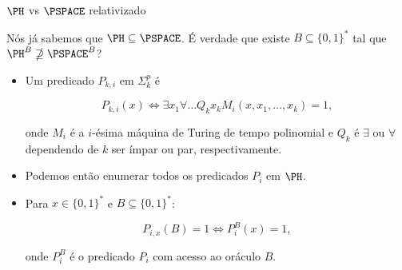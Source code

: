 \documentclass[landscape, 9pt]{beamer}
\newcommand{\binalph}{\{0, 1\}}
\begin{document}
\begin{frame} {$\PH$ vs $\PSPACE$ relativizado}

Nós já sabemos que $\PH \subseteq \PSPACE$. É verdade que existe $B \subseteq \binalph^{*}$ tal que $\PH^{B} \nsupseteq \PSPACE^{B}$?

\begin{itemize}

	\item Um predicado $P_{k, i}$ em $\Sigma_{k}^{p}$ é
	
	\begin{equation*}
		P_{k, i}(x) \iff \exists x_{1} \forall \dots Q_{k} x_{k} M_{i}(x, x_{1}, \dots, x_{k}) = 1,
	\end{equation*}
	
	onde $M_{i}$ é a $i$-ésima máquina de Turing de tempo polinomial e $Q_{k}$ é $\exists$ ou $\forall$ dependendo de $k$ ser ímpar ou par, respectivamente.
	
	\item Podemos então enumerar todos os predicados $P_{i}$ em $\PH$.
	
	\item Para $x \in \binalph^{*}$ e $B \subseteq \binalph^{*}$:
	
	\begin{equation*}
		P_{i, x}(B) = 1 \iff P_{i}^{B}(x) = 1,
	\end{equation*}
	
	onde $P_{i}^{B}$ é o predicado $P_{i}$ com acesso ao oráculo $B$.

\end{itemize}

\end{frame}

\end{document}
